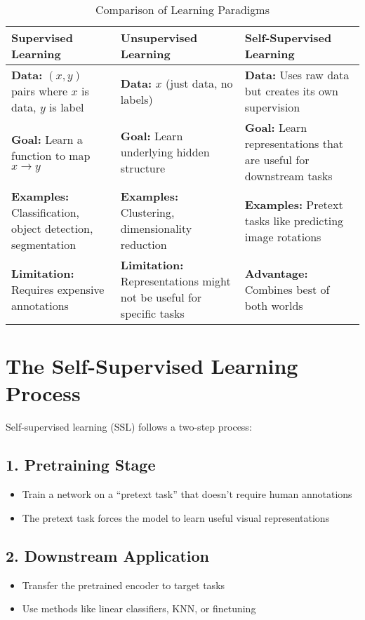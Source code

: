 \begin{table}[H]
\centering
\renewcommand{\arraystretch}{1.4}
\begin{tabular}{|p{4.2cm}|p{4.2cm}|p{4.2cm}|}
\hline
\textbf{Supervised Learning} & \textbf{Unsupervised Learning} & \textbf{Self-Supervised Learning} \\
\hline
\textbf{Data:} $(x, y)$ pairs where $x$ is data, $y$ is label & \textbf{Data:} $x$ (just data, no labels) & \textbf{Data:} Uses raw data but creates its own supervision \\
\hline
\textbf{Goal:} Learn a function to map $x \rightarrow y$ & \textbf{Goal:} Learn underlying hidden structure & \textbf{Goal:} Learn representations that are useful for downstream tasks \\
\hline
\textbf{Examples:} Classification, object detection, segmentation & \textbf{Examples:} Clustering, dimensionality reduction & \textbf{Examples:} Pretext tasks like predicting image rotations \\
\hline
\textbf{Limitation:} Requires expensive annotations & \textbf{Limitation:} Representations might not be useful for specific tasks & \textbf{Advantage:} Combines best of both worlds \\
\hline
\end{tabular}
\caption{Comparison of Learning Paradigms}
\end{table}
\section*{The Self-Supervised Learning Process}

Self-supervised learning (SSL) follows a two-step process:

\subsection*{1. Pretraining Stage}
\begin{itemize}
    \item Train a network on a ``pretext task'' that doesn't require human annotations
    \item The pretext task forces the model to learn useful visual representations
\end{itemize}

\subsection*{2. Downstream Application}
\begin{itemize}
    \item Transfer the pretrained encoder to target tasks
    \item Use methods like linear classifiers, KNN, or finetuning
\end{itemize}

